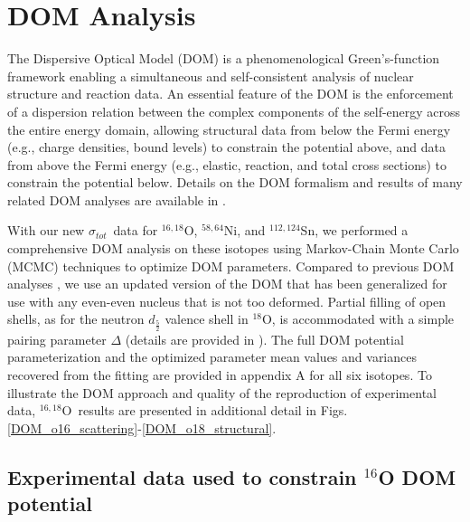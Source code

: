 \documentclass[twocolumn,secnumarabic,amssymb, nobibnotes, aps, prl,
superscriptaddress, nobalancelastpage]{revtex4}
\newcommand{\tot}{\ensuremath{\sigma_{tot}}}
\newcommand{\oEight}{\ensuremath{^{18}}O}
\newcommand{\oSixEight}{\ensuremath{^{16,18}}O}
\newcommand{\niEightFour}{\ensuremath{^{58,64}}N\lowercase{i}}
\newcommand{\snTwelveFour}{\ensuremath{^{112,124}}S\lowercase{n}}
\begin{document}
\section{DOM Analysis}

The Dispersive Optical Model (DOM) is a phenomenological Green's-function
framework enabling a simultaneous and self-consistent analysis of nuclear
structure and reaction data.
An essential feature of the DOM is the enforcement of a dispersion
relation between the complex components of the self-energy across the entire
energy domain, allowing structural data from below the Fermi energy
(e.g., charge densities, bound levels) to constrain the potential above,
and data from above the Fermi energy (e.g., elastic, reaction, and total
cross sections) to constrain the potential
below. Details on the DOM formalism and results of many related DOM analyses are
available in \cite{Mahaux1991, Dickhoff2018, PruittPhDThesis, AtkinsonPhDThesis, MahzoonPhDThesis}.

With our new \tot\ data for \oSixEight, \niEightFour, and \snTwelveFour, we
performed a comprehensive DOM analysis on these isotopes using Markov-Chain Monte Carlo
(MCMC) techniques to optimize DOM parameters. Compared to previous DOM analyses
\cite{Mueller2010, AtkinsonPhDThesis, MahzoonPhDThesis}, we use an updated version of the DOM
that has been generalized for use with any even-even nucleus that is not too
deformed. Partial filling of open shells, as for the neutron $d_{\frac{5}{2}}$
valence shell in \oEight, is accommodated with a simple
pairing parameter $\Delta$ (details are provided in \cite{PruittPhDThesis}).
The full DOM potential parameterization and the optimized parameter mean values
and variances recovered from the fitting are provided in appendix A for all six
isotopes. To illustrate the DOM approach and quality of the reproduction of experimental
data, \oSixEight\ results are presented in additional detail in Figs.
\ref{DOM_o16_scattering}-\ref{DOM_o18_structural}.

\subsection{Experimental data used to constrain $^{16}$O DOM potential}
\end{document}
